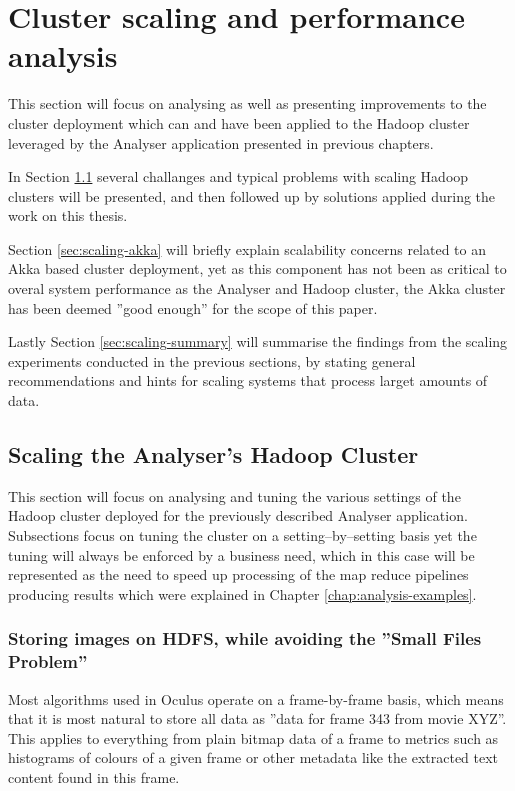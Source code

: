 \chapter{Cluster scaling and performance analysis}
\label{chap:perf-scalability}

This section will focus on analysing as well as presenting improvements to the cluster deployment which can and have been applied to the Hadoop cluster leveraged by the Analyser application presented in previous chapters.

In Section \ref{sec:scaling-hadoop} several challanges and typical problems with scaling Hadoop clusters will be presented, and then followed up by solutions applied during the work on this thesis.

Section \ref{sec:scaling-akka} will briefly explain scalability concerns related to an Akka based cluster deployment, yet as this component has not been as critical to overal system performance as the Analyser and Hadoop cluster, the Akka cluster has been deemed ''good enough'' for the scope of this paper.

Lastly Section \ref{sec:scaling-summary} will summarise the findings from the scaling experiments conducted in the previous sections, by stating general recommendations and hints for scaling systems that process larget amounts of data.

\section{Scaling the Analyser's Hadoop Cluster}
\label{sec:scaling-hadoop}
This section will focus on analysing and tuning the various settings of the Hadoop cluster deployed for the previously described Analyser application. Subsections focus on tuning the cluster on a setting--by--setting basis yet the tuning will always be enforced by a business need, which in this case will be represented as the need to speed up processing of the map reduce pipelines producing results which were explained in Chapter \ref{chap:analysis-examples}.

\subsection{Storing images on HDFS, while avoiding the ''Small Files Problem''}
\label{sec:sequence-files}
Most algorithms used in Oculus operate on a frame-by-frame basis, which means that it is most natural to store all data as ''data for frame 343 from movie XYZ''. This applies to everything from plain bitmap data of a frame to metrics such as histograms of colours of a given frame or other metadata like the extracted text content found in this frame.

